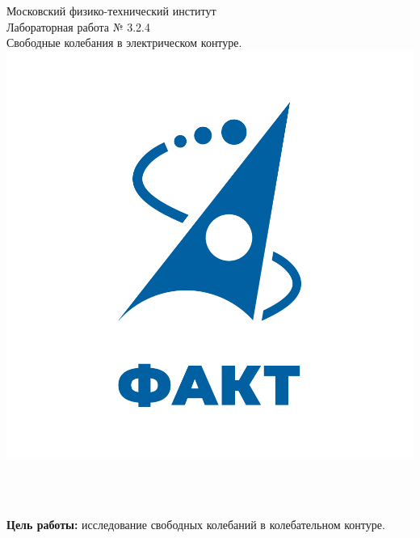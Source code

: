 \documentclass[a4paper,12pt]{article} %
\begin{document}

\begin{titlepage}
\begin{center}
	\large{Московский физико-технический институт}\\
	\vspace{100px}
	\LARGE{Лабораторная работа № 3.2.4}\\
	\LARGE{Свободные колебания в электрическом контуре.}\\
	\vspace{30px}
	\includegraphics[scale = 0.3]{fakt_logo.png}\\
\end{center}

\vfill
\begin{flushright}
	\\
	\\
\end{flushright}
\end{titlepage}

\newpage

\tableofcontents

\newpage

\textbf{Цель работы:} исследование свободных колебаний в колебательном контуре.
\end{document}
